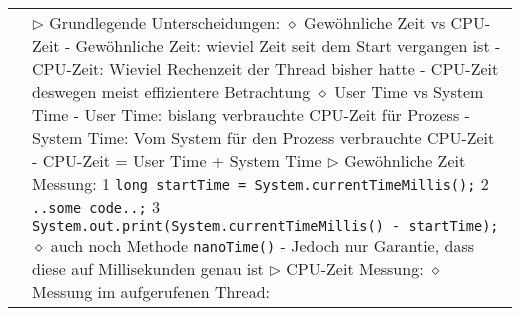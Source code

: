 	\begin{longtable}{ | p{} p{} | } 
	\hline 
	
	\makecell[l]{Laufzeit messen} & \makecell[l]{
	$\triangleright$ Grundlegende Unterscheidungen: \\
	\hspace{0.4cm} $\diamond$ Gewöhnliche Zeit vs CPU-Zeit \\
	\hspace{0.6cm} - Gewöhnliche Zeit: wieviel Zeit seit dem Start vergangen ist \\
	\hspace{0.6cm} - CPU-Zeit: Wieviel Rechenzeit der Thread bisher hatte \\
	\hspace{0.6cm} - CPU-Zeit deswegen meist effizientere Betrachtung \\
	\hspace{0.4cm} $\diamond$ User Time vs System Time \\
	\hspace{0.6cm} - User Time: bislang verbrauchte CPU-Zeit für Prozess \\
	\hspace{0.6cm} - System Time: Vom System für den Prozess verbrauchte CPU-Zeit \\
	\hspace{0.6cm} - CPU-Zeit = User Time + System Time \\
	$\triangleright$ Gewöhnliche Zeit Messung: \\
	\hspace{0.4cm} 1 \hspace{0.1cm} \texttt{long startTime = System.currentTimeMillis();} \\
	\hspace{0.4cm} 2 \hspace{0.1cm} \texttt{..some code..;} \\
	\hspace{0.4cm} 3 \hspace{0.1cm} \texttt{System.out.print(System.currentTimeMillis() - startTime);} \\
	\hspace{0.4cm} $\diamond$ auch noch Methode \texttt{nanoTime()} \\
	\hspace{0.6cm} - Jedoch nur Garantie, dass diese auf Millisekunden genau ist \\
	$\triangleright$ CPU-Zeit Messung: \\
	\hspace{0.4cm} $\diamond$ Messung im aufgerufenen Thread: \\
}
\end{longtable}
